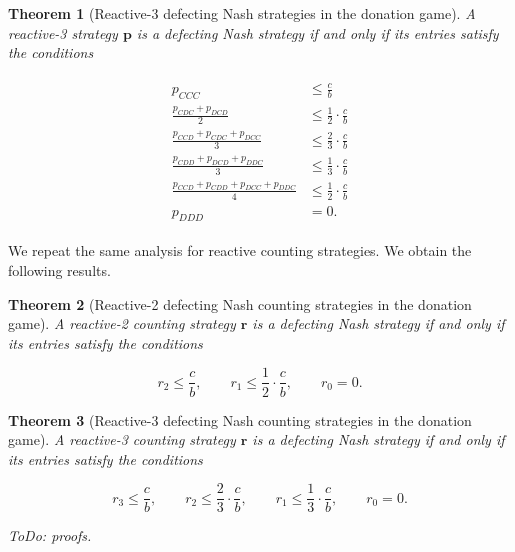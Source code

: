 \documentclass[11pt]{article}
\theoremstyle{plainCl1}
\newtheorem{theorem}{Theorem}
\theoremstyle{plainCl2}
\begin{document}
\begin{theorem}[Reactive-3 defecting Nash strategies in the donation game]
\label{theorem:reactive_three_defecting_strategies}
A reactive-3 strategy $\mathbf{p}$ is a defecting Nash strategy if and only if
its entries satisfy the conditions

\begin{align}\label{eq:defecting_conditions_three}
  \begin{split}
  p_{CCC} & \le \frac{c}{b} \\
  \frac{p_{CDC} + p_{DCD}}{2} & \leq \frac{1}{2} \cdot \frac{c}{b} \\
  \frac{p_{CCD} + p_{CDC} + p_{DCC}}{3} & \leq \frac{2}{3} \cdot \frac{c}{b} \\
  \frac{p_{CDD} + p_{DCD} + p_{DDC}}{3} & \leq \frac{1}{3} \cdot \frac{c}{b} \\
  \frac{p_{CCD} + p_{CDD} + p_{DCC} + p_{DDC}}{4}  & \leq \frac{1}{2} \cdot \frac{c}{b}  \\
  p_{DDD} & = 0.
  \end{split}
\end{align}

\end{theorem}

We repeat the same analysis for reactive counting strategies. We obtain the
following results.


\begin{theorem}[Reactive-2 defecting Nash counting strategies in the donation game]
\label{theorem:reactive_two_defecting_counting_strategies}
A reactive-2 counting strategy $\mathbf{r}$ is a defecting Nash strategy if and only if
its entries satisfy the conditions

\begin{equation}\label{eq:defecting_conditions_two_counting}
  r_{2} \le \frac{c}{b}, \qquad \displaystyle r_{1} \le \frac{1}{2} \cdot \frac{c}{b}, \qquad r_{0} = 0.
\end{equation}
\end{theorem}


\begin{theorem}[Reactive-3 defecting Nash counting strategies in the donation game]
\label{theorem:reactive_three_defecting_counting_strategies}
A reactive-3 counting strategy $\mathbf{r}$ is a defecting Nash strategy if and only if
its entries satisfy the conditions

\begin{equation}\label{eq:defecting_conditions_three_counting}
  r_{3} \le \frac{c}{b}, \qquad r_{2} \leq\frac{2}{3} \cdot \frac{c}{b}, \qquad
  r_{1} \leq\frac{1}{3} \cdot \frac{c}{b}, \qquad
  r_{0} = 0.
\end{equation}

ToDo: proofs.
\end{theorem}
\end{document}
